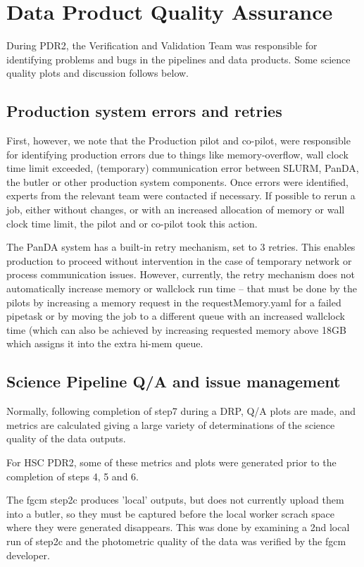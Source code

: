 \section{Data Product Quality Assurance} \label{sec:qa}

During PDR2, the Verification and Validation Team was responsible 
for identifying problems and bugs in the pipelines and data products. 
Some science quality plots and discussion follows below.

\subsection{Production system errors and retries}

First, however, we note that the Production pilot and co-pilot, 
were responsible for identifying production errors due to things 
like memory-overflow, wall clock time limit exceeded, 
(temporary) communication error between SLURM, PanDA, the butler or other 
production system components.  Once errors were
identified, experts from the relevant team were contacted if necessary.
If possible to rerun a job, either without changes, or with an
increased allocation of memory or wall clock time limit, the pilot and
or co-pilot took this action.

The PanDA system has a built-in retry mechanism, set to 3 retries.  This
enables production to proceed without intervention in the case of
temporary network or process communication issues. However,
currently, the retry mechanism does not automatically increase memory
or wallclock run time -- that must be done by the pilots by increasing
a memory request in the requestMemory.yaml for a failed pipetask or
by moving the job to a different queue with an increased wallclock time
(which can also be achieved by increasing requested memory above 18GB which
assigns it into the extra hi-mem queue.

\subsection{Science Pipeline Q/A and issue management}

Normally, following completion of step7 during a DRP, Q/A plots are made,
and metrics are calculated giving a large variety of determinations of
the science quality of the data outputs.

For HSC PDR2, some of these metrics and plots were generated prior to 
the completion of steps 4, 5 and 6.

The fgcm step2c produces 'local' outputs, but does not currently upload them 
into a butler, so they must be captured before the local worker scrach space where they were
generated disappears.  This was done by examining a 2nd local run of step2c and the 
photometric quality of the
data was verified by the fgcm developer.
 
